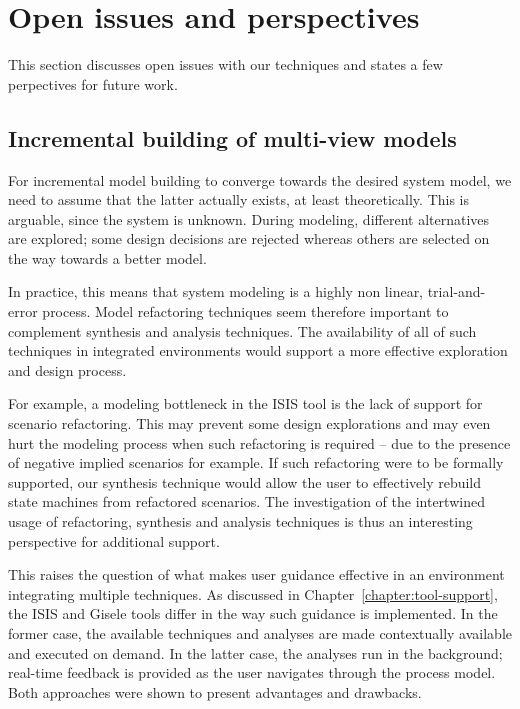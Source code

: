 \section{Open issues and perspectives}

This section discusses open issues with our techniques and states a few perpectives for future work.

\subsection*{Incremental building of multi-view models}

For incremental model building to converge towards the desired system model, we need to assume that the latter actually exists, at least theoretically. This is arguable, since the system is unknown. During modeling, different alternatives are explored; some design decisions are rejected whereas others are selected on the way towards a better model.

In practice, this means that system modeling is a highly non linear, trial-and-error process. Model refactoring techniques seem therefore important to complement synthesis and analysis techniques. The availability of all of such techniques in integrated environments would support a more effective exploration and design process. 

For example, a modeling bottleneck in the ISIS tool is the lack of support for scenario refactoring. This may prevent some design explorations and may even hurt the modeling process when such refactoring is required -- due to the presence of negative implied scenarios for example. If such refactoring were to be formally supported, our  synthesis technique would allow the user to effectively rebuild state machines from refactored scenarios. The investigation of the intertwined usage of refactoring, synthesis and analysis techniques is thus an interesting perspective for additional support.

This raises the question of what makes user guidance effective in an environment integrating multiple techniques. As discussed in Chapter~\ref{chapter:tool-support}, the ISIS and Gisele tools differ in the way such guidance is implemented. In the former case, the available techniques and analyses are made contextually available and executed on demand. In the latter case, the analyses run in the background; real-time feedback is provided as the user navigates through the process model. Both approaches were shown to present advantages and drawbacks.


